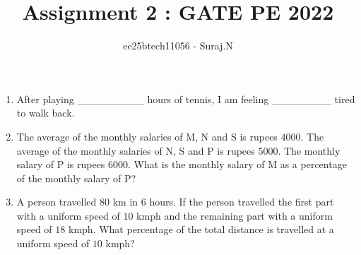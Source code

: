 \documentclass[journal,12pt,onecolumn]{IEEEtran}
\theoremstyle{remark}
\begin{document}
\title{Assignment 2 : GATE PE 2022}
\author{ee25btech11056 - Suraj.N}
\maketitle
\renewcommand{\thefigure}{\theenumi}
\renewcommand{\thetable}{\theenumi}

\begin{enumerate}

\item After playing \_\_\_\_\_\_\_\_\_ hours of tennis, I am feeling \_\_\_\_\_\_\_\_ tired to walk back. 

\hfill{}

\begin{enumerate}
\end{enumerate}

\item The average of the monthly salaries of M, N and S is  rupees $4000$. The average of the monthly salaries of N, S and P is rupees $5000$. The monthly salary of P is rupees $6000$. What is the monthly salary of M as a percentage of the monthly salary of P?

\hfill{}

\begin{enumerate}
\end{enumerate}

\item A person travelled $80$ km in $6$ hours. If the person travelled the first part with a uniform speed of $10$ kmph and the remaining part with a uniform speed of $18$ kmph. What percentage of the total distance is travelled at a uniform speed of $10$ kmph?

\hfill{}

\begin{enumerate}
\end{enumerate}


\end{enumerate}
\end{document}
